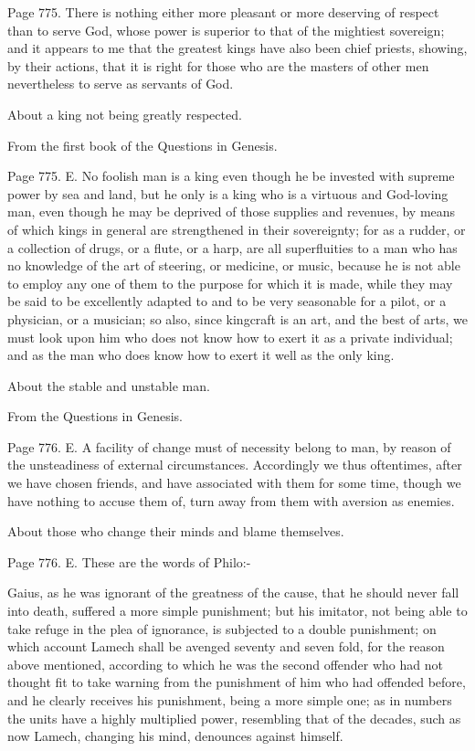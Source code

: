 Page 775. There is nothing either more pleasant or more deserving of respect than to serve God,
whose power is superior to that of the mightiest sovereign; and it appears to me that the greatest
kings have also been chief priests, showing, by their actions, that it is right for those who are the
masters of other men nevertheless to serve as servants of God.

About a king not being greatly respected.

From the first book of the Questions in Genesis.

Page 775. E. No foolish man is a king even though he be invested with supreme power by sea and
land, but he only is a king who is a virtuous and God-loving man, even though he may be deprived
of those supplies and revenues, by means of which kings in general are strengthened in their
sovereignty; for as a rudder, or a collection of drugs, or a flute, or a harp, are all superfluities to a
man who has no knowledge of the art of steering, or medicine, or music, because he is not able to
employ any one of them to the purpose for which it is made, while they may be said to be
excellently adapted to and to be very seasonable for a pilot, or a physician, or a musician; so also,
since kingcraft is an art, and the best of arts, we must look upon him who does not know how to
exert it as a private individual; and as the man who does know how to exert it well as the only king.

About the stable and unstable man.

From the Questions in Genesis.

Page 776. E. A facility of change must of necessity belong to man, by reason of the unsteadiness
of external circumstances. Accordingly we thus oftentimes, after we have chosen friends, and
have associated with them for some time, though we have nothing to accuse them of, turn away
from them with aversion as enemies.

About those who change their minds and blame themselves.

Page 776. E. These are the words of Philo:-

Gaius, as he was ignorant of the greatness of the cause, that he should never fall into death,
suffered a more simple punishment; but his imitator, not being able to take refuge in the plea of
ignorance, is subjected to a double punishment; on which account Lamech shall be avenged
seventy and seven fold, for the reason above mentioned, according to which he was the second
offender who had not thought fit to take warning from the punishment of him who had offended
before, and he clearly receives his punishment, being a more simple one; as in numbers the units
have a highly multiplied power, resembling that of the decades, such as now Lamech, changing his
mind, denounces against himself.


